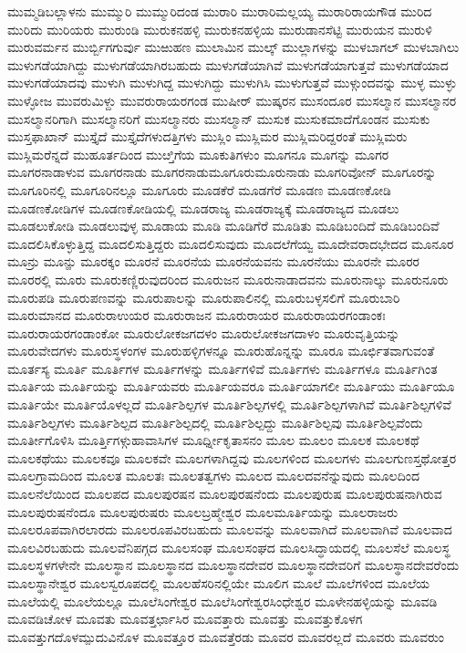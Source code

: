 {ಮುಮ್ಮಡಿಬಲ್ಲಾಳನು
ಮುಮ್ಮುರಿ
ಮುಮ್ಮುರಿದಂಡ
ಮುರಾರಿ
ಮುರಾರಿಮಲ್ಲಯ್ಯ
ಮುರಾರಿರಾಯಗೌಡ
ಮುರಿದ
ಮುರಿದು
ಮುರಿಯರು
ಮುರುಂಡಿ
ಮುರುಕನಹಳ್ಳಿ
ಮುರುಕನಹಳ್ಳಿಯ
ಮುರುಡಾನಸೆಟ್ಟಿ
ಮುರುಯನ
ಮುರುಳಿ
ಮುರುವರ್ಮನ
ಮುರ್ಬ್ಬಿಗಗುರ್ವು
ಮುಱುಹಣ
ಮುಲಾಮಿನ
ಮುಲ್ಕ್
ಮುಲ್ಲಾಗಳನ್ನು
ಮುಳಬಾಗಲ್
ಮುಳಬಾಗಿಲು
ಮುಳುಗಡೆಯಾಗಿದ್ದು
ಮುಳುಗಡೆಯಾಗಿರಬಹುದು
ಮುಳುಗಡೆಯಾಗಿವೆ
ಮುಳುಗಡೆಯಾಗುತ್ತವೆ
ಮುಳುಗಡೆಯಾದ
ಮುಳುಗಡೆಯಾದವು
ಮುಳುಗಿ
ಮುಳುಗಿದ್ದ
ಮುಳುಗಿದ್ದು
ಮುಳುಗಿಸಿ
ಮುಳುಗುತ್ತವೆ
ಮುಳ್ಗುಂದವನ್ನು
ಮುಳ್ಳ
ಮುಳ್ಳು
ಮುಳ್ಳೋಜ
ಮುವರುಮಿಳ್ದು
ಮುವರುರಾಯರಗಂಡ
ಮುಷೀರ್
ಮುಷ್ಕರನ
ಮುಸಂದೂರ
ಮುಸಲ್ಮಾನ
ಮುಸಲ್ಮಾನರ
ಮುಸಲ್ಮಾನರಿಗಾಗಿ
ಮುಸಲ್ಮಾನರಿಗೆ
ಮುಸಲ್ಮಾನರು
ಮುಸಲ್ಮಾನ್
ಮುಸುಕ
ಮುಸುಕಮಾದೆಗೊಂಡನ
ಮುಸುಕು
ಮುಸ್ತಫಾಖಾನ್
ಮುಸ್ತೈದೆ
ಮುಸ್ತೈದೆಗಳುದತ್ತಿಗಳು
ಮುಸ್ಲಿಂ
ಮುಸ್ಲಿಮರ
ಮುಸ್ಲಿಮರಿದ್ದರಂತೆ
ಮುಸ್ಲಿಮರು
ಮುಸ್ಲಿಮರೆನ್ನದೆ
ಮುಹೂರ್ತದಿಂದ
ಮುೞ್ತಿಗೆಯ
ಮೂಕುತಿಗಳುಂ
ಮೂಗನೂ
ಮೂಗನ್ನು
ಮೂಗರ
ಮೂಗರನಾಡಾಳುವ
ಮೂಗರನಾಡು
ಮೂಗರನಾಡುಮೂಗೂರುಮೂರುನಾಡು
ಮೂಗರಿವೋನ್
ಮೂಗೂರನ್ನು
ಮೂಗೂರಿನಲ್ಲಿ
ಮೂಗೂರಿನಲ್ಲೂ
ಮೂಗೂರು
ಮೂಡಕೆರೆ
ಮೂಡಗೆರೆ
ಮೂಡಣ
ಮೂಡಣಕೋಡಿ
ಮೂಡಣಕೋಡಿಗಳ
ಮೂಡಣಕೋಡಿಯಲ್ಲಿ
ಮೂಡರಾಜ್ಯ
ಮೂಡರಾಜ್ಯಕ್ಕೆ
ಮೂಡರಾಜ್ಯದ
ಮೂಡಲು
ಮೂಡಲುಕೋಡಿ
ಮೂಡಲುವುಳ್ಳ
ಮೂಡಾಯ
ಮೂಡಿ
ಮೂಡಿಗೆರೆ
ಮೂಡಿತು
ಮೂಡಿಬಂದಿದೆ
ಮೂಡಿಬಂದಿವೆ
ಮೂದಲಿಸಿಕೊಳ್ಳುತ್ತಿದ್ದ
ಮೂದಲಿಸುತ್ತಿದ್ದರು
ಮೂದಲಿಸುವುದು
ಮೂದಲೆಗೆಯ್ವ
ಮೂದೇವರಾದಭೇದದ
ಮೂನೂರ
ಮೂನ್ರು
ಮೂನ್ಱು
ಮೂರಕ್ಕಂ
ಮೂರನೆ
ಮೂರನೆಯ
ಮೂರನೆಯವನು
ಮೂರನೆಯು
ಮೂರನೇ
ಮೂರರ
ಮೂರರಲ್ಲಿ
ಮೂರು
ಮೂರುಕಣ್ಣಿರುವುದರಿಂದ
ಮೂರುಜನ
ಮೂರುನಾಡಾದವನು
ಮೂರುನಾಲ್ಕು
ಮೂರುನೂರು
ಮೂರುಪಡಿ
ಮೂರುಪಣವನ್ನು
ಮೂರುಪಾಲನ್ನು
ಮೂರುಪಾಲಿನಲ್ಲಿ
ಮೂರುಬಳ್ಳಸಲಿಗೆ
ಮೂರುಬಾರಿ
ಮೂರುಮಾನದ
ಮೂರುರಾಉಯರ
ಮೂರುರಾಜನ
ಮೂರುರಾಯರ
ಮೂರುರಾಯರಗಂಡಾಂಕಃ
ಮೂರುರಾಯರಗಂಡಾಂಕೋ
ಮೂರುಲೋಕಜಗದಳಂ
ಮೂರುಲೋಕಜಗದಾಳಂ
ಮೂರುವೃತ್ತಿಯನ್ನು
ಮೂರುವೇದಗಳು
ಮೂರುಸ್ಥಳಂಗಳ
ಮೂರುಹಳ್ಳಿಗಳನ್ನೂ
ಮೂರುಹೊನ್ನನ್ನು
ಮೂರೂ
ಮೂರ್ಛಿತವಾಗುವಂತೆ
ಮೂರ್ತಸ್ಯ
ಮೂರ್ತಿ
ಮೂರ್ತಿಗಳ
ಮೂರ್ತಿಗಳನ್ನು
ಮೂರ್ತಿಗಳಿವೆ
ಮೂರ್ತಿಗಳು
ಮೂರ್ತಿಗಳೂ
ಮೂರ್ತಿಗಿಂತ
ಮೂರ್ತಿಯ
ಮೂರ್ತಿಯನ್ನು
ಮೂರ್ತಿಯವರು
ಮೂರ್ತಿಯವರೂ
ಮೂರ್ತಿಯಾಗಲೀ
ಮೂರ್ತಿಯು
ಮೂರ್ತಿಯೂ
ಮೂರ್ತಿಯೇ
ಮೂರ್ತಿಯೊಳಲ್ಲದೆ
ಮೂರ್ತಿಶಿಲ್ಪಗಳ
ಮೂರ್ತಿಶಿಲ್ಪಗಳಲ್ಲಿ
ಮೂರ್ತಿಶಿಲ್ಪಗಳಾಗಿವೆ
ಮೂರ್ತಿಶಿಲ್ಪಗಳಿವೆ
ಮೂರ್ತಿಶಿಲ್ಪಗಳು
ಮೂರ್ತಿಶಿಲ್ಪದ
ಮೂರ್ತಿಶಿಲ್ಪದಲ್ಲಿ
ಮೂರ್ತಿಶಿಲ್ಪದ್ದು
ಮೂರ್ತಿಶಿಲ್ಪವು
ಮೂರ್ತಿಶಿಲ್ಪವೆಂದು
ಮೂರ್ತೀಗೊಳಿಸಿ
ಮೂರ್ತ್ತಿಗಳ್ಗುಹಾವಾಸಿಗಳ
ಮೂರ್ಧ್ನೀಕೃತಾಸನಂ
ಮೂಲ
ಮೂಲಂ
ಮೂಲಕ
ಮೂಲಕಥೆ
ಮೂಲಕಥೆಯು
ಮೂಲಕವೂ
ಮೂಲಕವೇ
ಮೂಲಗಳಾಗಿದ್ದವು
ಮೂಲಗಳಿಂದ
ಮೂಲಗಳು
ಮೂಲಗುಣಸ್ತಥೋತ್ತರ
ಮೂಲಗ್ರಾಮದಿಂದ
ಮೂಲತ
ಮೂಲತಃ
ಮೂಲತತ್ವಗಳು
ಮೂಲದ
ಮೂಲದವನೆನ್ನುವುದು
ಮೂಲದಿಂದ
ಮೂಲನೆಲೆಯಿಂದ
ಮೂಲಪದ
ಮೂಲಪುರಷನ
ಮೂಲಪುರಷನೆಂದು
ಮೂಲಪುರುಷ
ಮೂಲಪುರುಷನಾಗಿರುವ
ಮೂಲಪುರುಷನೆಂದೂ
ಮೂಲಪುರುಷರು
ಮೂಲಬ್ರಹ್ಮೇಶ್ವರ
ಮೂಲಮೂರ್ತಿಯನ್ನು
ಮೂಲರಾಜರು
ಮೂಲರೂಪವಾಗಿರಲಾರದು
ಮೂಲರೂಪವಿರಬಹುದು
ಮೂಲವನ್ನು
ಮೂಲವಾಗಿದೆ
ಮೂಲವಾಗಿವೆ
ಮೂಲವಾದ
ಮೂಲವಿರಬಹುದು
ಮೂಲವೆನಿಪಗ್ಗದ
ಮೂಲಸಂಘ
ಮೂಲಸಂಘದ
ಮೂಲಸಿದ್ಧಾಯದಲ್ಲಿ
ಮೂಲಸೆಲೆ
ಮೂಲಸ್ಥ
ಮೂಲಸ್ಥಳಗಳೇನೇ
ಮೂಲಸ್ಥಾನ
ಮೂಲಸ್ಥಾನದ
ಮೂಲಸ್ಥಾನದೇವರ
ಮೂಲಸ್ಥಾನದೇವರಿಗೆ
ಮೂಲಸ್ಥಾನದೇವರೆಂದು
ಮೂಲಸ್ಥಾನೇಶ್ವರ
ಮೂಲಸ್ವರೂಪದಲ್ಲಿ
ಮೂಲಹೆಸರಿನಲ್ಲಿಯೇ
ಮೂಲಿಗ
ಮೂಲೆ
ಮೂಲೆಗಳಿಂದ
ಮೂಲೆಯ
ಮೂಲೆಯಲ್ಲಿ
ಮೂಲೆಯಲ್ಲೂ
ಮೂಲೆಸಿಂಗೇಶ್ವರ
ಮೂಲೆಸಿಂಗೇಶ್ವರಸಿಂಧೇಶ್ವರ
ಮೂಳೇನಹಳ್ಳಿಯನ್ನು
ಮೂವಡಿ
ಮೂವಡಿಚೋಳ
ಮೂವತು
ಮೂವತ್ತರ್ಛಾಸಿರ
ಮೂವತ್ತಾರು
ಮೂವತ್ತು
ಮೂವತ್ತುಕೊಳಗ
ಮೂವತ್ತುಗದೊಳಮ್ಪುದುವಿನೊಳ
ಮೂವತ್ತೂರ
ಮೂವತ್ತೆರಡು
ಮೂವರ
ಮೂವರಲ್ಲದೆ
ಮೂವರು
ಮೂವರುಂ
}
